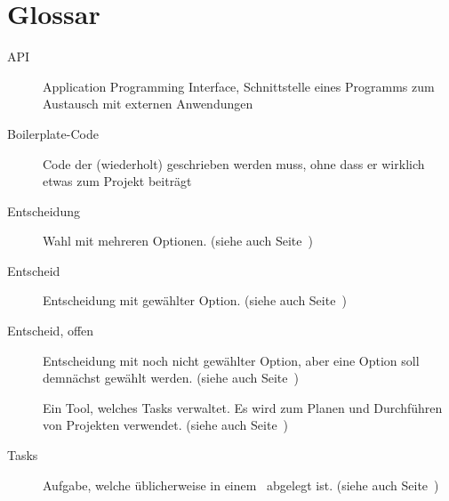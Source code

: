 \chapter{Glossar}
	\begin{description}
		\item[API]{Application Programming Interface, Schnittstelle eines Programms zum Austausch mit externen Anwendungen}
		\item[Boilerplate-Code]{Code der (wiederholt) geschrieben werden muss, ohne dass er wirklich etwas zum Projekt beiträgt}
		\item[Entscheidung]{Wahl mit mehreren Optionen. (siehe auch Seite~\pageref{userstoryDefinitions})}
		\item[Entscheid]{Entscheidung mit gewählter Option. (siehe auch Seite~\pageref{userstoryDefinitions})}
		\item[Entscheid, offen]{Entscheidung mit noch nicht gewählter Option, aber eine Option soll demnächst gewählt werden. (siehe auch Seite~\pageref{userstoryDefinitions})}
		\item[\ppt]{Ein Tool, welches Tasks verwaltet. Es wird zum Planen und Durchführen von Projekten verwendet. (siehe auch Seite~\pageref{userstoryDefinitions})}
		\item[Tasks]{Aufgabe, welche üblicherweise in einem \ppt\ abgelegt ist. (siehe auch Seite~\pageref{userstoryDefinitions})}
	\end{description}